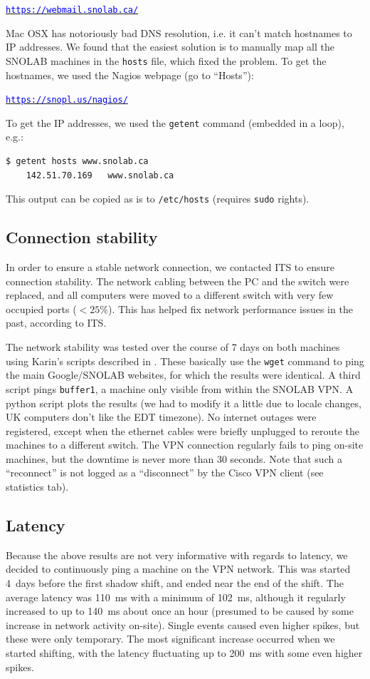 \documentclass[a4paper,10pt]{article}
\newcommand{\link}[1]{\href{#1}{\textcolor{blue}{\texttt{#1}}}} %
\begin{document}
\qquad\link{https://webmail.snolab.ca/}

Mac OSX has notoriously bad DNS resolution, i.e. it can't match hostnames to IP addresses. We found that the easiest solution is to manually map all the SNOLAB machines in the {\tt hosts} file, which fixed the problem. To get the hostnames, we used the Nagios webpage (go to ``Hosts''):

\qquad\link{https://snopl.us/nagios/}

To get the IP addresses, we used the {\tt getent} command (embedded in a loop), e.g.:
\begin{Verbatim}[xleftmargin=-8mm]
	$ getent hosts www.snolab.ca
	142.51.70.169   www.snolab.ca
\end{Verbatim}
This output can be copied as is to {\tt /etc/hosts} (requires {\tt sudo} rights).

\subsection{Connection stability}
In order to ensure a stable network connection, we contacted ITS to ensure connection stability. The network cabling between the PC and the switch were replaced, and all computers were moved to a different switch with very few occupied ports ($<25\%$). This has helped fix network performance issues in the past, according to ITS.

The network stability was tested over the course of 7 days on both machines using Karin's scripts described in \cite{doc5040}. These basically use the {\tt wget} command to ping the main Google/SNOLAB websites, for which the results were identical. A third script pings {\tt buffer1}, a machine only visible from within the SNOLAB VPN. A python script plots the results (we had to modify it a little due to locale changes, UK computers don't like the EDT timezone). No internet outages were registered, except when the ethernet cables were briefly unplugged to reroute the machines to a different switch. The VPN connection regularly fails to ping on-site machines, but the downtime is never more than 30 seconds. Note that such a ``reconnect'' is not logged as a ``disconnect'' by the Cisco VPN client (see statistics tab).

\subsection{Latency}
Because the above results are not very informative with regards to latency, we decided to continuously ping a machine on the VPN network. This was started 4~days before the first shadow shift, and ended near the end of the shift. The average latency was 110~ms with a minimum of 102~ms, although it regularly increased to up to 140~ms about once an hour (presumed to be caused by some increase in network activity on-site). Single events caused even higher spikes, but these were only temporary. The most significant increase occurred when we started shifting, with the latency fluctuating up to 200~ms with some even higher spikes.
\end{document}

